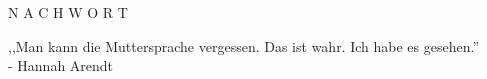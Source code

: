 \documentclass[12pt]{article}
\begin{document}
\begingroup
\begin{center}
\end{center}
\endgroup

\vspace{13\baselineskip}

\begingroup
\begin{center}
\huge N A C H W O R T
\end{center}
\endgroup

\vspace{6\baselineskip}

\begingroup
\begin{center}
,,Man kann die Muttersprache vergessen. Das ist wahr. Ich habe es gesehen.'' \\ 
- Hannah Arendt
\end{center}
\endgroup
\end{document}
